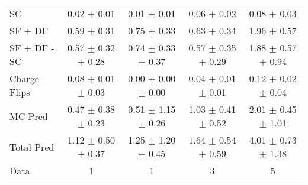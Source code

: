 \begin{tabular}{l|cccc}
                                 SC &  0.02 $\pm$  0.01 &  0.01 $\pm$  0.01 &  0.06 $\pm$  0.02 &  0.08 $\pm$  0.03 \\
                            SF + DF &  0.59 $\pm$  0.31 &  0.75 $\pm$  0.33 &  0.63 $\pm$  0.34 &  1.96 $\pm$  0.57 \\
\hline
                       SF + DF - SC &  0.57 $\pm$  0.32 $\pm$  0.28 &  0.74 $\pm$  0.33 $\pm$  0.37 &  0.57 $\pm$  0.35 $\pm$  0.29 &  1.88 $\pm$  0.57 $\pm$  0.94 \\
\hline\hline
                       Charge Flips &  0.08 $\pm$  0.01 $\pm$  0.03 &  0.00 $\pm$  0.00 $\pm$  0.00 &  0.04 $\pm$  0.01 $\pm$  0.01 &  0.12 $\pm$  0.02 $\pm$  0.04 \\
\hline
                            MC Pred &  0.47 $\pm$  0.38 $\pm$  0.23 &  0.51 $\pm$  1.15 $\pm$  0.26 &  1.03 $\pm$  0.41 $\pm$  0.52 &  2.01 $\pm$  0.45 $\pm$  1.01 \\
\hline
                         Total Pred &  1.12 $\pm$  0.50 $\pm$  0.37 &  1.25 $\pm$  1.20 $\pm$  0.45 &  1.64 $\pm$  0.54 $\pm$  0.59 &  4.01 $\pm$  0.73 $\pm$  1.38 \\
\hline\hline
                               Data &     1 &     1 &     3 &     5 \\
\hline\hline
\end{tabular}

